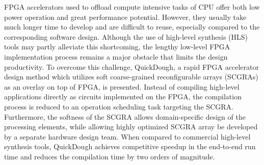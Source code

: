 FPGA accelerators used to offload compute intensive tasks of CPU offer both low power operation and great performance potential. However, they usually take much longer time to develop and are difficult to reuse, especially compared to the corresponding software design. Although the use of high-level synthesis (HLS) tools may partly alleviate this shortcoming, the lengthy low-level FPGA implementation process remains a major obstacle that limits the design productivity. To overcome this challenge, QuickDough, a rapid FPGA accelerator design method which utilizes soft coarse-grained reconfigurable arrays (SCGRAs) as an overlay on top of FPGA, is presented. Instead of compiling high-level applications directly as circuits implemented on the FPGA, the compilation process is reduced to an operation scheduling task targeting the SCGRA. Furthermore, the softness of the SCGRA allows domain-specific design of the processing elements, while allowing highly optimized SCGRA array be developed by a separate hardware design team. When compared to commercial high-level synthesis tools, QuickDough achieves competitive speedup in the end-to-end run time and reduces the compilation time by two orders of magnitude. 
